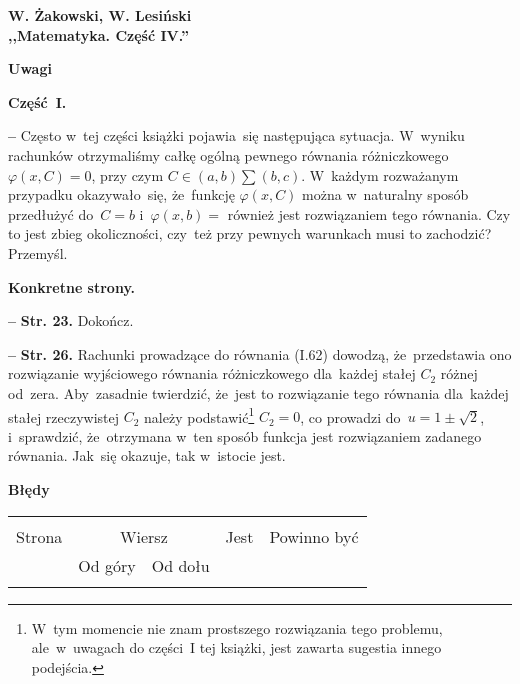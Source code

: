 \documentclass[a4paper,11pt]{article}
\newcommand{\spaceOne}{2em}
\newcommand{\spaceTwo}{1em}
\newcommand{\spaceThree}{0.5em}
\newcommand{\vp}{\varphi}
\newcommand{\tb}{\textbf}
\newcommand{\noi}{\noindent}
\newcommand{\start}{\noi \tb{--} {}}
\newcommand{\Center}[1]{\begin{center} #1 \end{center}}
\newcommand{\CenterTB}[1]{\Center{\tb{#1}}}
\newcommand{\Str}[1]{\tb{Str. #1.}}
\newcommand{\Prze}{{\color{red} Przemyśl.}}
\newcommand{\Dok}{{\color{red} Dokończ.}}
\newcommand{\Work}[1]{ \begin{center} {\large \tb{#1} } \end{center} }
\begin{document}
\vspace{\spaceOne}



\Work{
  W. Żakowski, W. Lesiński \\
  ,,Matematyka. Część IV.'' %
}


\CenterTB{Uwagi}


\noi \tb{Część~I.}

\vspace{\spaceThree}


\start Często w~tej części książki pojawia~się następująca sytuacja.
W~wyniku rachunków otrzymaliśmy całkę ogólną pewnego równania
różniczkowego $\vp( x, C ) = 0$, przy czym
$C \in ( a, b ) \sum ( b, c )$. W~każdym rozważanym przypadku
okazywało~się, że~funkcję $\vp( x, C )$ można w~naturalny sposób
przedłużyć do~$C = b$ i~$\vp( x, b ) = $ również jest rozwiązaniem
tego równania. Czy to jest zbieg okoliczności, czy~też przy pewnych
warunkach musi to zachodzić? \Prze
\vspace{\spaceTwo}



\noi \tb{Konkretne strony.}
\vspace{\spaceThree}


\start \Str{23} \Dok

\start \Str{26} Rachunki prowadzące do równania (I.62) dowodzą,
że~przedstawia ono rozwiązanie wyjściowego równania różniczkowego
dla~każdej stałej $C_{ 2 }$ różnej od~zera. Aby~zasadnie twierdzić,
że~jest to rozwiązanie tego równania dla~każdej stałej rzeczywistej
$C_{ 2 }$ należy podstawić\footnote{W~tym momencie nie znam prostszego
  rozwiązania tego problemu, ale~w~uwagach do części~I tej książki,
  jest zawarta sugestia innego podejścia.} $C_{ 2 } = 0$, co prowadzi
do~$u = 1 \pm \sqrt{2}$, i~sprawdzić, że~otrzymana w~ten sposób
funkcja jest rozwiązaniem zadanego równania. Jak~się okazuje, tak
w~istocie jest.

\CenterTB{Błędy}
\begin{center}
  \begin{tabular}{|c|c|c|c|c|}
    \hline
    & \multicolumn{2}{c|}{} & & \\
    Strona & \multicolumn{2}{c|}{Wiersz}& Jest & Powinno być \\ \cline{2-3}
    & Od góry & Od dołu &  &  \\ \hline
    & & & & \\ \hline
  \end{tabular}
\end{center}



 {}
\end{document}
